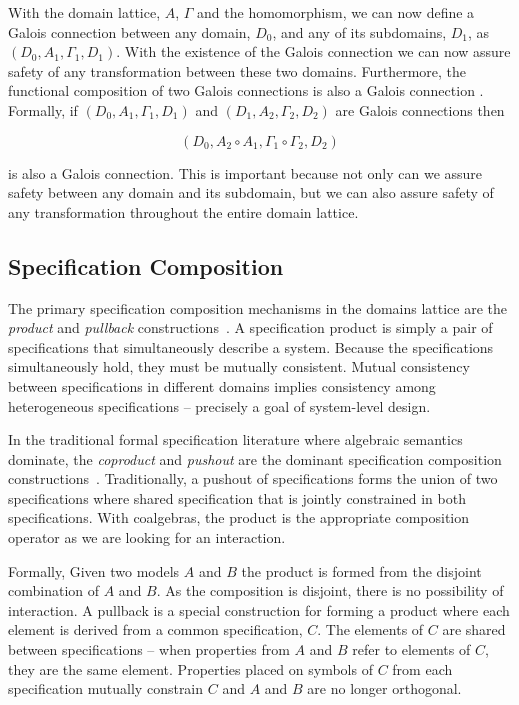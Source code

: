 \documentclass[12pt]{article}
\begin{document}
With the domain lattice, $A$, $\Gamma$ and the homomorphism, we can
now define a Galois connection between any domain, $D_0$, and any of
its subdomains, $D_1$, as $(D_0,A_1,\Gamma_1,D_1)$.  With the
existence of the Galois connection we can now assure safety of any
transformation between these two domains.  Furthermore, the
functional composition of two Galois connections is also a Galois
connection \cite{Nielson:05:Principles-of-P}. Formally, if $(D_0, A_1,
\Gamma_1, D_1)$ and $(D_1, A_2, \Gamma_2,D_2)$ are Galois connections
then

\[(D_0, A_2 \circ A_1, \Gamma_1 \circ \Gamma_2, D_2)\]

\noindent is also a Galois connection.  This is important because not only
can we assure safety between any domain and its subdomain, but we can
also assure safety of any transformation throughout the entire domain
lattice.  

\subsection{Specification Composition}

The primary specification composition mechanisms in the domains
lattice are the \emph{product} and \emph{pullback}
constructions~\cite{Ehrig:85:Fundamentals-of}.  A specification
product is simply a pair of specifications that simultaneously
describe a system.  Because the specifications simultaneously hold,
they must be mutually consistent.  Mutual consistency between
specifications in different domains implies consistency among
heterogeneous specifications -- precisely a goal of system-level
design.

In the traditional formal specification literature where algebraic
semantics dominate, the \emph{coproduct} and \emph{pushout} are the
dominant specification composition
constructions~\cite{Ehrig:85:Fundamentals-of,Smith:93:Constructing-Sp,Smith:90:KIDS:-A-Semiaut}.
Traditionally, a pushout of specifications forms the union of two
specifications where shared specification that is jointly constrained
in both specifications.  With coalgebras, the product is the
appropriate composition operator as we are looking for an interaction.

Formally, Given two models $A$ and $B$ the product is formed from the
disjoint combination of $A$ and $B$. As the composition is disjoint,
there is no possibility of interaction.  A pullback is a special
construction for forming a product where each element is derived from
a common specification, $C$.  The elements of $C$ are shared between
specifications -- when properties from $A$ and $B$ refer to
elements of $C$, they are the same element.  Properties placed on
symbols of $C$ from each specification mutually constrain $C$ and $A$
and $B$ are no longer orthogonal.
\end{document}
